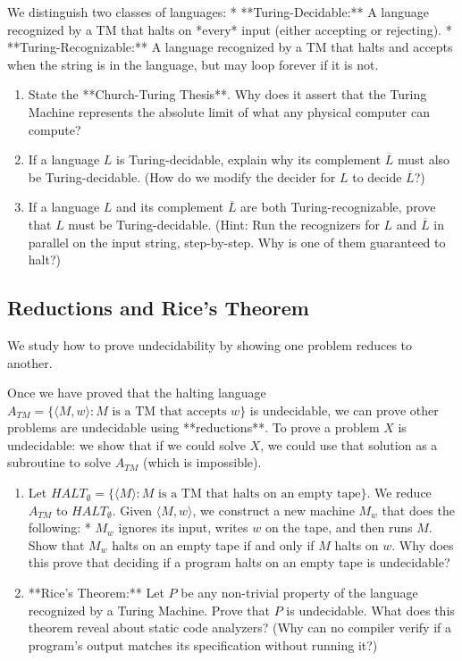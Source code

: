 \documentclass[12pt, a4paper]{book}
\begin{document}
\begin{explobox}
We distinguish two classes of languages:
* **Turing-Decidable:** A language recognized by a TM that halts on *every* input (either accepting or rejecting).
* **Turing-Recognizable:** A language recognized by a TM that halts and accepts when the string is in the language, but may loop forever if it is not.
\begin{enumerate}[label=(\alph*), leftmargin=*]
  \item State the **Church-Turing Thesis**. Why does it assert that the Turing Machine represents the absolute limit of what any physical computer can compute?
  \item If a language $L$ is Turing-decidable, explain why its complement $\overline{L}$ must also be Turing-decidable. (How do we modify the decider for $L$ to decide $\overline{L}$?)
  \item If a language $L$ and its complement $\overline{L}$ are both Turing-recognizable, prove that $L$ must be Turing-decidable. (Hint: Run the recognizers for $L$ and $\overline{L}$ in parallel on the input string, step-by-step. Why is one of them guaranteed to halt?)
\end{enumerate}
\end{explobox}

\subsection{Reductions and Rice's Theorem}

We study how to prove undecidability by showing one problem reduces to another.

\begin{explobox}
Once we have proved that the halting language $A_{TM} = \{\langle M, w \rangle : M \text{ is a TM that accepts } w\}$ is undecidable, we can prove other problems are undecidable using **reductions**.
To prove a problem $X$ is undecidable: we show that if we could solve $X$, we could use that solution as a subroutine to solve $A_{TM}$ (which is impossible).
\begin{enumerate}[label=(\alph*), leftmargin=*]
  \item Let $HALT_{\emptyset} = \{\langle M \rangle : M \text{ is a TM that halts on an empty tape}\}$.
        We reduce $A_{TM}$ to $HALT_{\emptyset}$.
        Given $\langle M, w \rangle$, we construct a new machine $M_w$ that does the following:
        * $M_w$ ignores its input, writes $w$ on the tape, and then runs $M$.
        Show that $M_w$ halts on an empty tape if and only if $M$ halts on $w$.
        Why does this prove that deciding if a program halts on an empty tape is undecidable?
  \item **Rice's Theorem:** Let $P$ be any non-trivial property of the language recognized by a Turing Machine.
        Prove that $P$ is undecidable.
        What does this theorem reveal about static code analyzers? (Why can no compiler verify if a program's output matches its specification without running it?)
\end{enumerate}
\end{explobox}
\end{document}
